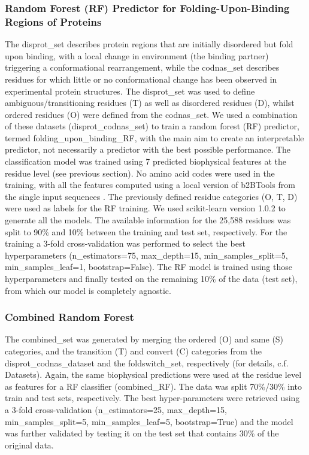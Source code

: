 \subsubsection{Random Forest (RF) Predictor for Folding-Upon-Binding Regions of Proteins}
The disprot_set describes protein regions that are initially disordered but fold upon binding, with a local change in environment (the binding partner) triggering a conformational rearrangement, while the codnas_set describes residues for which little or no conformational change has been observed in experimental protein structures. The disprot_set was used to define ambiguous/transitioning residues (T) as well as disordered residues (D), whilst ordered residues (O) were defined from the codnas_set. We used a combination of these datasets (disprot_codnas_set) to train a random forest (RF) predictor, termed folding_upon_binding_RF, with the main aim to create an interpretable predictor, not necessarily a predictor with the best possible performance. The classification model was trained using 7 predicted biophysical features at the residue level (see previous section). No amino acid codes were used in the training, with all the features computed using a local version of b2BTools from the single input sequences \cite{kagami_b2btools_2021}. The previously defined residue categories (O, T, D) were used as labels for the RF training.  We used scikit-learn \cite{pedregosa_scikit-learn_2012} version 1.0.2 to generate all the models. The available information for the 25,588 residues was split to 90\% and 10\% between the training and test set, respectively. For the training a 3-fold cross-validation was performed to select the best hyperparameters (n_estimators=75, max_depth=15, min_samples_split=5, min_samples_leaf=1, bootstrap=False). The RF model is trained using those hyperparameters and finally tested on the remaining 10\% of the data (test set), from which our model is completely agnostic.


\subsubsection{Combined Random Forest}
The combined_set was generated by merging the ordered (O) and same (S) categories, and the transition (T) and convert (C) categories from the disprot_codnas_dataset and the foldswitch_set, respectively (for details, c.f. Datasets). Again, the same biophysical predictions were used at the residue level as features for a RF classifier (combined_RF). The data was split 70\%/30\% into train and test sets, respectively. The best hyper-parameters were retrieved using a 3-fold cross-validation (n_estimators=25, max_depth=15, min_samples_split=5, min_samples_leaf=5, bootstrap=True) and the model was further validated by testing it on the test set that contains 30\% of the original data.


